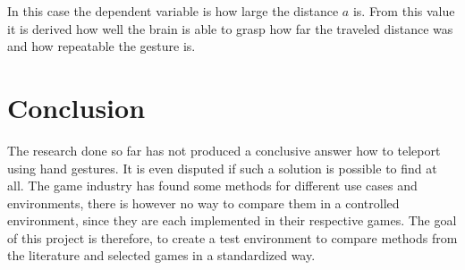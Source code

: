 In this case the dependent variable is how large the distance $a$ is. From this value it is derived how well the brain is able to grasp how far the traveled distance was and how repeatable the gesture is.

\section{Conclusion}
The research done so far has not produced a conclusive answer how to teleport using hand gestures. It is even disputed if such a solution is possible to find at all. The game industry has found some methods for different use cases and environments, there is however no way to compare them in a controlled environment, since they are each implemented in their respective games. The goal of this project is therefore, to create a test environment to compare methods from the literature and selected games in a standardized way. 
